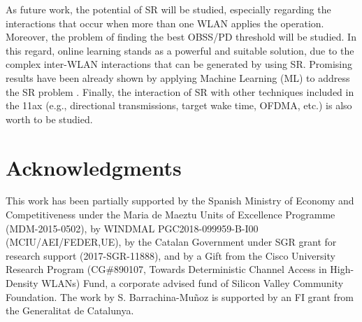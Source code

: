 \documentclass{article}
\begin{document}
	As future work, the potential of SR will be studied, especially regarding the interactions that occur when more than one WLAN applies the operation. Moreover, the problem of finding the best OBSS/PD threshold will be studied. In this regard, online learning stands as a powerful and suitable solution, due to the complex inter-WLAN interactions that can be generated by using SR. Promising results have been already shown by applying Machine Learning (ML) to address the SR problem \cite{collaborative, potential}. Finally, the interaction of SR with other techniques included in the 11ax (e.g., directional transmissions, target wake time, OFDMA, etc.) is also worth to be studied.
	
	\section*{Acknowledgments}
	This  work  has  been  partially  supported  by  the Spanish Ministry of Economy and Competitiveness under the Maria de Maeztu  Units  of  Excellence  Programme (MDM-2015-0502), by WINDMAL PGC2018-099959-B-I00 (MCIU/AEI/FEDER,UE), by the Catalan Government under SGR grant for research support (2017-SGR-11888),  and  by a Gift from the Cisco University Research Program (CG\#890107, Towards Deterministic Channel Access in High-Density WLANs) Fund, a corporate advised fund of Silicon Valley Community Foundation. The work by S. Barrachina-Mu\~noz is supported by an FI grant from the Generalitat de Catalunya.
	
\end{document}

